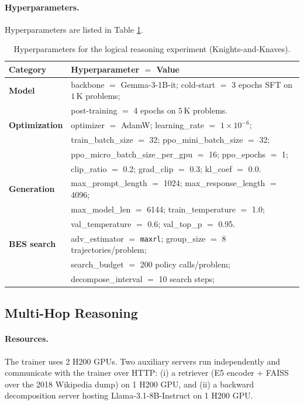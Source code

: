\documentclass{llmxive}
\begin{document}
\paragraph{Hyperparameters.}
Hyperparameters are listed in Table \ref{tab:hyperparams_logical}.

\begin{table}[h]
\centering
\begin{tabularx}{\textwidth}{@{}lX@{}}
\toprule
\textbf{Category} & \textbf{Hyperparameter $=$ Value} \\
\midrule
\textbf{Model} &
backbone $=$ Gemma-3-1B-it; cold-start $=$ 3 epochs SFT on $1\,$K problems; \\
& post-training $=$ 4 epochs on $5\,$K problems. \\
\midrule
\textbf{Optimization} &
optimizer $=$ AdamW; learning\_rate $=$ $1\!\times\!10^{-6}$; \\
& train\_batch\_size $=$ 32; ppo\_mini\_batch\_size $=$ 32; \\
& ppo\_micro\_batch\_size\_per\_gpu $=$ 16; ppo\_epochs $=$ 1; \\
& clip\_ratio $=$ 0.2; grad\_clip $=$ 0.3; kl\_coef $=$ 0.0. \\
\midrule
\textbf{Generation} &
max\_prompt\_length $=$ 1024; max\_response\_length $=$ 4096; \\
& max\_model\_len $=$ 6144; train\_temperature $=$ 1.0; \\
& val\_temperature $=$ 0.6; val\_top\_p $=$ 0.95. \\
\midrule
\textbf{BES search} &
adv\_estimator $=$ \texttt{maxrl}; group\_size $=$ 8 trajectories/problem; \\
& search\_budget $=$ 200 policy calls/problem; \\
& decompose\_interval $=$ 10 search steps;  \\
\bottomrule
\end{tabularx}
\caption{Hyperparameters for the logical reasoning experiment (Knights-and-Knaves).}
\label{tab:hyperparams_logical}
\end{table}


\subsection{Multi-Hop Reasoning}
\label{app:qa_setup}

\paragraph{Resources.}
The trainer uses 2 H200 GPUs. Two auxiliary
servers run independently and communicate with the trainer over HTTP:
(i) a retriever (E5 encoder + FAISS over the 2018 Wikipedia dump) on
1 H200 GPU, and (ii) a backward decomposition server hosting
Llama-3.1-8B-Instruct on 1 H200 GPU.
\end{document}
